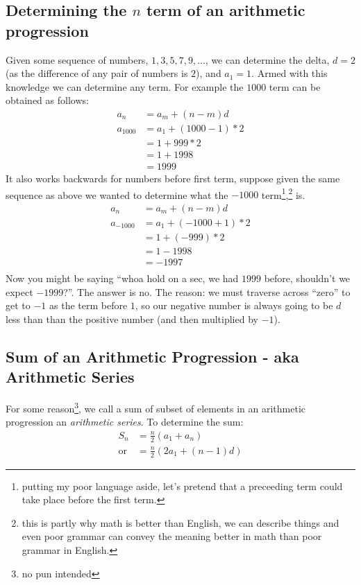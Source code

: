 \subsection{Determining the $n$ term of an arithmetic progression}
\label{sec:nthTermOfAnArithmeticProgression}
Given some sequence of numbers, $1, 3, 5, 7, 9, \ldots$, we can determine the
delta, $d=2$ (as the difference of any pair of numbers is $2$), and $a_1 = 1$.
Armed with this knowledge we can determine any term. For example the
$1000$ term can be obtained as follows:
\begin{align}
  a_n &= a_m + (n-m)d \nonumber \\
  a_{1000} &= a_{1} + (1000-1)*2 \\
    &= 1 + 999*2 \\
    &= 1 + 1998 \\
    &= 1999
\end{align}
It also works backwards for numbers before first term, suppose given the same
sequence as above we wanted to determine what the $-1000$
term\footnote{putting my poor language aside, let's pretend that a preceeding
term could take place before the first term.},\tsup{,}\footnote{this is partly
why math is better than English, we can describe things and even poor grammar
can convey the meaning better in math than poor grammar in English.} is.
\begin{align}
  a_n &= a_m + (n-m)d \nonumber \\
  a_{-1000} &= a_{1} + (-1000+1)*2 \\
    &= 1 + (-999)*2 \\
    &= 1 -1998 \\
    &= -1997 \\
\end{align}
Now you might be saying ``whoa hold on a sec, we had $1999$ before, shouldn't we
expect $-1999$?''. The answer is no. The reason: we must traverse across
``zero'' to get to $-1$ as the term before $1$, so our negative number is always
going to be $d$ less than than the positive number (and then multiplied by
$-1$).
\newpage
\subsection{Sum of an Arithmetic Progression - aka Arithmetic Series}
\label{sec:ArithmeticSeries}
For some reason\footnote{no pun intended}, we call a sum of subset of elements
in an arithmetic progression an \emph{arithmetic series}. To determine the sum:
\begin{align}
  S_n
    &= \frac{n}{2}(a_1 + a_n) \label{eq:ArithmeticSum1}\\
    \text{or}
    &= \frac{n}{2}(2a_1 + (n-1)d) \label{eq:ArithmeticSum2}
\end{align}

